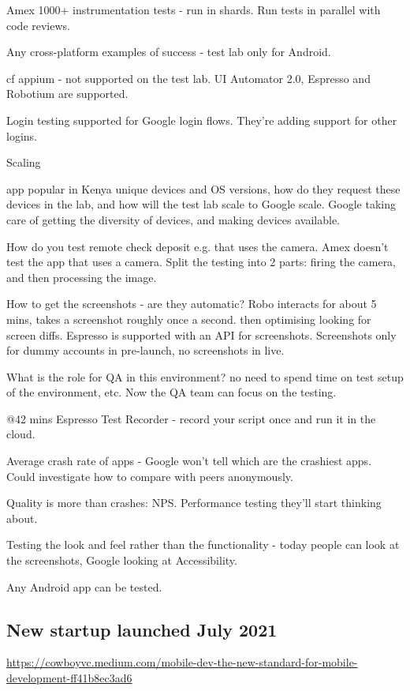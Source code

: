Amex 1000+ instrumentation tests - run in shards. Run tests in parallel with code reviews. 

Any cross-platform examples of success - test lab only for Android. 

cf appium - not supported on the test lab. UI Automator 2.0, Espresso and Robotium are supported.

Login testing supported for Google login flows. They’re adding support for other logins.

Scaling

app popular in Kenya unique devices and OS versions, how do they request these devices in the lab, and how will the test lab scale to Google scale. Google taking care of getting the diversity of devices, and making devices available. 

How do you test remote check deposit e.g. that uses the camera. Amex doesn’t test the app that uses a camera. Split the testing into 2 parts: firing the camera, and then processing the image.

How to get the screenshots - are they automatic? Robo interacts for about 5 mins, takes a screenshot roughly once a second. then optimising looking for screen diffs. Espresso is supported with an API for screenshots. Screenshots only for dummy accounts in pre-launch, no screenshots in live.

What is the role for QA in this environment? no need to spend time on test setup of the environment, etc. Now the QA team can focus on the testing. 

@42 mins Espresso Test Recorder - record your script once and run it in the cloud.


Average crash rate of apps - Google won’t tell which are the crashiest apps. Could investigate how to compare with peers anonymously. 

Quality is more than crashes: NPS. Performance testing they’ll start thinking about. 

Testing the look and feel rather than the functionality - today people can look at the screenshots, Google looking at Accessibility. 

Any Android app can be tested. 


\subsection{New startup launched July 2021}
\url{https://cowboyvc.medium.com/mobile-dev-the-new-standard-for-mobile-development-ff41b8ec3ad6}

